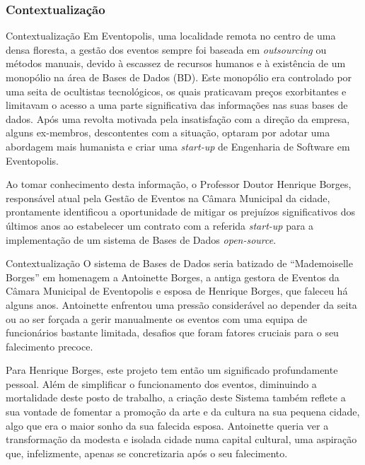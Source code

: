 \documentclass[compress,svgnames,handout,13.7pt]{beamer}
\begin{document}
\subsubsection{Contextualização}
\begin{frame}{Contextualização}
Em Eventopolis, uma localidade remota no centro de uma densa floresta, a gestão dos eventos sempre foi baseada em \textit{outsourcing} ou métodos manuais, devido à escassez de recursos humanos e à existência de um monopólio na área de Bases de Dados (BD). Este monopólio era controlado por uma seita de ocultistas tecnológicos, os quais praticavam preços exorbitantes e limitavam o acesso a uma parte significativa das informações nas suas bases de dados. Após uma revolta motivada pela insatisfação com a direção da empresa, alguns ex-membros, descontentes com a situação, optaram por adotar uma abordagem mais humanista e criar uma \textit{start-up} de Engenharia de Software em Eventopolis.
    
    Ao tomar conhecimento desta informação, o Professor Doutor Henrique Borges, responsável atual pela Gestão de Eventos na Câmara Municipal da cidade, prontamente identificou a oportunidade de mitigar os prejuízos significativos dos últimos anos ao estabelecer um contrato com a referida \textit{start-up} para a implementação de um sistema de Bases de Dados \textit{open-source}.
\end{frame}
\begin{frame}{Contextualização}
 O sistema de Bases de Dados seria batizado de ``Mademoiselle Borges'' em homenagem a Antoinette Borges, a antiga gestora de Eventos da Câmara Municipal de Eventopolis e esposa de Henrique Borges, que faleceu há alguns anos. Antoinette enfrentou uma pressão considerável ao depender da seita ou ao ser forçada a gerir manualmente os eventos com uma equipa de funcionários bastante limitada, desafios que foram fatores cruciais para o seu falecimento precoce.
   
Para Henrique Borges, este projeto tem então um significado profundamente pessoal. Além de simplificar o funcionamento dos eventos, diminuindo a mortalidade deste posto de trabalho, a criação deste Sistema também reflete a sua vontade de fomentar a promoção da arte e da cultura na sua pequena cidade, algo que era o maior sonho da sua falecida esposa. Antoinette queria ver a transformação da modesta e isolada cidade numa capital cultural, uma aspiração que, infelizmente, apenas se concretizaria após o seu falecimento.
\end{frame}
\end{document}
